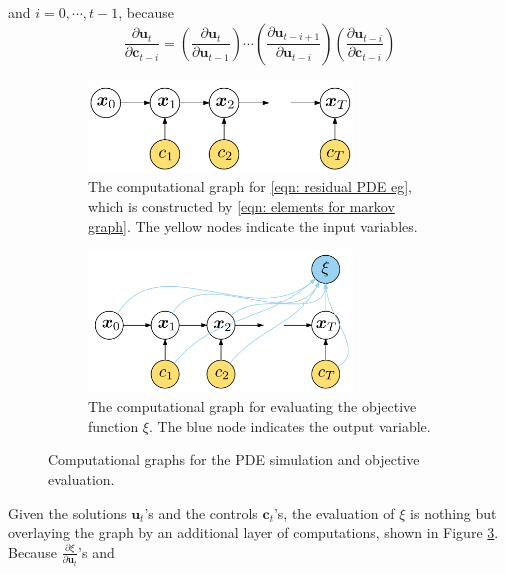 and $i=0, \cdots, t-1$, because
\begin{equation}
    \frac{\partial \boldsymbol{u}_t}{\partial \boldsymbol{c}_{t-i}} 
    = \left(\frac{\partial \boldsymbol{u}_t}{\partial \boldsymbol{u}_{t-1}}\right)\cdots
    \left(\frac{\partial \boldsymbol{u}_{t-i+1}}{\partial \boldsymbol{u}_{t-i}}\right)
    \left(\frac{\partial \boldsymbol{u}_{t-i}}{\partial \boldsymbol{c}_{t-i}}\right)
\end{equation}
\begin{figure}[htbp]\begin{center}
    \begin{subfigure}[t]{.99\textwidth}
        \centering
        \includegraphics[width=7cm]{../markovChain.png}
        \caption{The computational graph for \eqref{eqn: residual PDE eg}, which is constructed
                 by \eqref{eqn: elements for markov graph}. The yellow
                 nodes indicate the input variables.}
        \label{fig: chap1 graph 1}
    \end{subfigure}
    \begin{subfigure}[t]{.99\textwidth}
        \centering
        \includegraphics[width=7cm]{../markovChain2.png}
        \caption{The computational graph for evaluating the objective function $\xi$.
                 The blue node indicates the output variable.}
        \label{fig: chap1 graph 2}
    \end{subfigure}
    \caption{Computational graphs for the PDE simulation and objective evaluation.}
\end{center}\end{figure}
Given the solutions $\boldsymbol{u}_t$'s and the controls $\boldsymbol{c}_t$'s, 
the evaluation of $\xi$ is nothing but overlaying the graph by an additional 
layer of computations, shown in Figure \ref{fig: chap1 graph 2}.
Because $\frac{\partial \xi}{\partial \boldsymbol{u}_t}$'s and 

